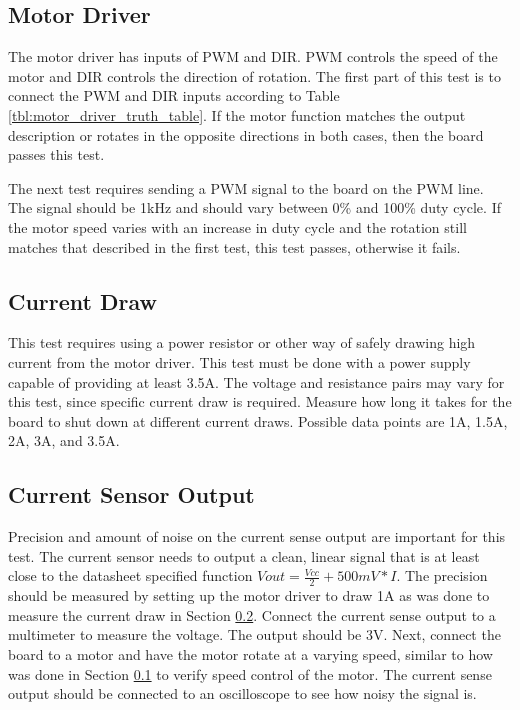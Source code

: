 \documentclass[12pt,letterpaper]{article}
\begin{document}
	\subsection{Motor Driver}
	\label{sec:mdcs_md}
	The motor driver has inputs of PWM and DIR. PWM controls the speed of the motor and DIR controls the direction of rotation. The first part of this test is to connect the PWM and DIR inputs according to Table \ref{tbl:motor_driver_truth_table}. If the motor function matches the output description or rotates in the opposite directions in both cases, then the board passes this test.
	
	The next test requires sending a PWM signal to the board on the PWM line. The signal should be 1kHz and should vary between 0\% and 100\% duty cycle. If the motor speed varies with an increase in duty cycle and the rotation still matches that described in the first test, this test passes, otherwise it fails.
	
	\subsection{Current Draw}
	\label{sec:mdcs_cd}
	This test requires using a power resistor or other way of safely drawing high current from the motor driver. This test must be done with a power supply capable of providing at least 3.5A. The voltage and resistance pairs may vary for this test, since specific current draw is required. Measure how long it takes for the board to shut down at different current draws. Possible data points are 1A, 1.5A, 2A, 3A, and 3.5A. %
	
	\subsection{Current Sensor Output}
	Precision and amount of noise on the current sense output are important for this test. The current sensor needs to output a clean, linear signal that is at least close to the datasheet specified function $Vout = \frac{Vcc}{2}+500mV*I$. The precision should be measured by setting up the motor driver to draw 1A as was done to measure the current draw in Section \ref{sec:mdcs_cd}. Connect the current sense output to a multimeter to measure the voltage. The output should be 3V. Next, connect the board to a motor and have the motor rotate at a varying speed, similar to how was done in Section \ref{sec:mdcs_md} to verify speed control of the motor. The current sense output should be connected to an oscilloscope to see how noisy the signal is. %
	
\end{document}
